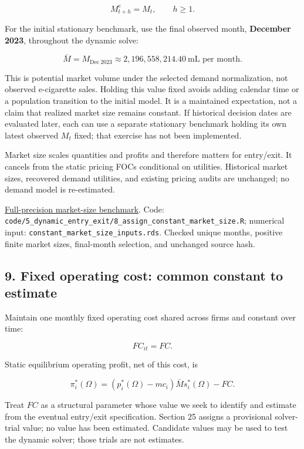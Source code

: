 \documentclass[10pt,]{article}
\begin{document}
\[
M_{t+h}^{e}=M_t,\qquad h\geq1.
\]

For the initial stationary benchmark, use the final observed month,
\textbf{December 2023}, throughout the dynamic solve:

\[
\bar M=M_{\mathrm{Dec\ 2023}}\approx 2{,}196{,}558{,}214.40\ \text{mL per month}.
\]

This is potential market volume under the selected demand normalization,
not observed e-cigarette sales. Holding this value fixed avoids adding
calendar time or a population transition to the initial model. It is a
maintained expectation, not a claim that realized market size remains
constant. If historical decision dates are evaluated later, each can use
a separate stationary benchmark holding its own latest observed \(M_t\)
fixed; that exercise has not been implemented.

Market size scales quantities and profits and therefore matters for
entry/exit. It cancels from the static pricing FOCs conditional on
utilities. Historical market sizes, recovered demand utilities, and
existing pricing audits are unchanged; no demand model is re-estimated.

\href{../../output/dynamic_entry_exit/constant_market_size_2026-11-03/constant_market_size.csv}{Full-precision
market-size benchmark}. Code:
\texttt{code/5\_dynamic\_entry\_exit/8\_assign\_constant\_market\_size.R};
numerical input: \texttt{constant\_market\_size\_inputs.rds}. Checked
unique months, positive finite market sizes, final-month selection, and
unchanged source hash.

\subsection{9. Fixed operating cost: common constant to
estimate}\label{fixed-operating-cost-common-constant-to-estimate}

Maintain one monthly fixed operating cost shared across firms and
constant over time:

\[
FC_{it}=FC.
\]

Static equilibrium operating profit, net of this cost, is

\[
\pi_i^*(\Omega)=(p_i^*(\Omega)-mc_i)\bar M s_i^*(\Omega)-FC.
\]

Treat \(FC\) as a structural parameter whose value we seek to identify
and estimate from the eventual entry/exit specification. Section 25
assigns a provisional solver-trial value; no value has been estimated.
Candidate values may be used to test the dynamic solver; those trials
are not estimates.
\end{document}
